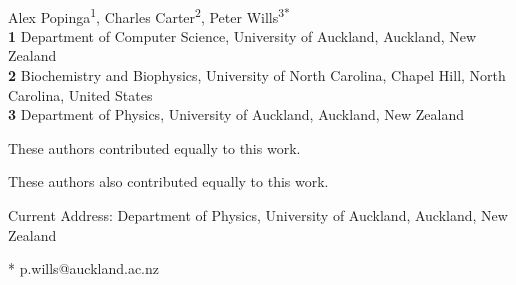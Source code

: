 \documentclass[10pt,letterpaper]{article}
\date{}
\begin{document}
\vspace*{0.2in}

\begin{flushleft}
{\Large
\textbf{} %
}
\newline
\\
Alex Popinga\textsuperscript{1},
Charles Carter\textsuperscript{2},
Peter Wills\textsuperscript{3*}
\\
\bigskip
\textbf{1} Department of Computer Science, University of Auckland, Auckland, New Zealand
\\
\textbf{2} Biochemistry and Biophysics, University of North Carolina, Chapel Hill, North Carolina, United States
\\
\textbf{3} Department of Physics, University of Auckland, Auckland, New Zealand
\\
\bigskip

% 
%
\Yinyang These authors contributed equally to this work.

\ddag These authors also contributed equally to this work.

\textcurrency Current Address: Department of Physics, University of Auckland, Auckland, New Zealand %



* p.wills@auckland.ac.nz

\end{flushleft}
\end{document}
